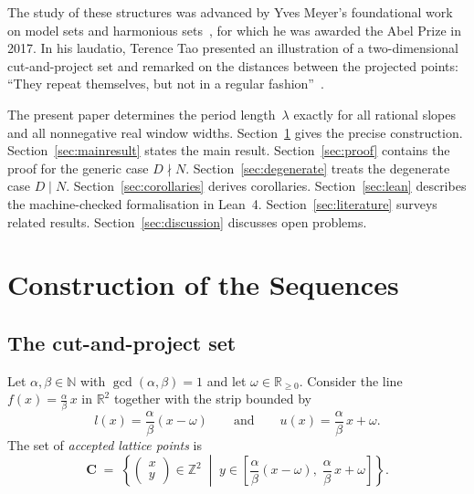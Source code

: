 \documentclass[11pt]{article}
\theoremstyle{plain}
\theoremstyle{definition}
\theoremstyle{remark}
\begin{document}
The study of these structures was advanced by Yves Meyer's foundational work
on model sets and harmonious sets~\cite{Meyer1972}, for which he was awarded
the Abel Prize in 2017.  In his laudatio, Terence Tao presented an
illustration of a two-dimensional cut-and-project set and remarked on the
distances between the projected points: ``They repeat themselves, but not in
a regular fashion''~\cite{SpeechTao}.

The present paper determines the period length~$\lambda$ exactly for all
rational slopes and all nonnegative real window widths.
Section~\ref{sec:setup} gives the precise construction.
Section~\ref{sec:mainresult} states the main result.
Section~\ref{sec:proof} contains the proof for the generic case $D \nmid N$.
Section~\ref{sec:degenerate} treats the degenerate case $D \mid N$.
Section~\ref{sec:corollaries} derives corollaries.
Section~\ref{sec:lean} describes the machine-checked formalisation in Lean~4.
Section~\ref{sec:literature} surveys related results.
Section~\ref{sec:discussion} discusses open problems.

\section{Construction of the Sequences}\label{sec:setup}

\subsection{The cut-and-project set}\label{subsec:construction}

Let $\alpha, \beta \in \mathbb{N}$ with $\gcd(\alpha, \beta) = 1$ and let
$\omega \in \mathbb{R}_{\ge 0}$.
Consider the line $f(x) = \frac{\alpha}{\beta}\,x$ in $\mathbb{R}^2$ together
with the strip bounded by
\[
    l(x) = \frac{\alpha}{\beta}(x - \omega)
    \qquad\text{and}\qquad
    u(x) = \frac{\alpha}{\beta}\,x + \omega.
\]
The set of \emph{accepted lattice points} is
\begin{equation}\label{eq:points}
    \mathbf{C} \;=\; \left\{
    \begin{pmatrix} x \\ y \end{pmatrix} \in \mathbb{Z}^2
    \;\middle|\;
    y \in
    \left[\frac{\alpha}{\beta}(x - \omega),\;
          \frac{\alpha}{\beta}\,x + \omega\right]
    \right\}.
\end{equation}
\end{document}
